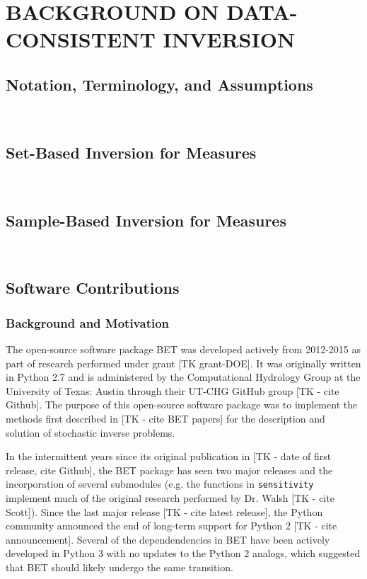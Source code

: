 \chapter{\uppercase{Background on Data-Consistent Inversion} \label{chapter:02}}

\section{Notation, Terminology, and Assumptions}

\
\section{Set-Based Inversion for Measures}

\
\section{Sample-Based Inversion for Measures \label{sec:ch02:sample}}

\
\section{Software Contributions}

\subsection{Background and Motivation}
The open-source software package BET was developed actively from 2012-2015 as part of research performed under grant [TK grant-DOE].
It was originally written in Python 2.7 and is administered by the Computational Hydrology Group at the University of Texas: Austin through their UT-CHG GitHub group [TK - cite Github]. 
The purpose of this open-source software package was to implement the methods first described in [TK - cite BET papers] for the description and solution of stochastic inverse problems. 

In the intermittent years since its original publication in [TK - date of first release, cite Github], the BET package has seen two major releases and the incorporation of several submodules (e.g. the functions in {\tt sensitivity} implement much of the original research performed by Dr. Walsh [TK - cite Scott]). 
Since the last major release [TK - cite latest release], the Python community announced the end of long-term support for Python 2 [TK - cite announcement]. 
Several of the dependendencies in BET have been actively developed in Python 3 with no updates to the Python 2 analogs, which suggested that BET should likely undergo the same transition.


